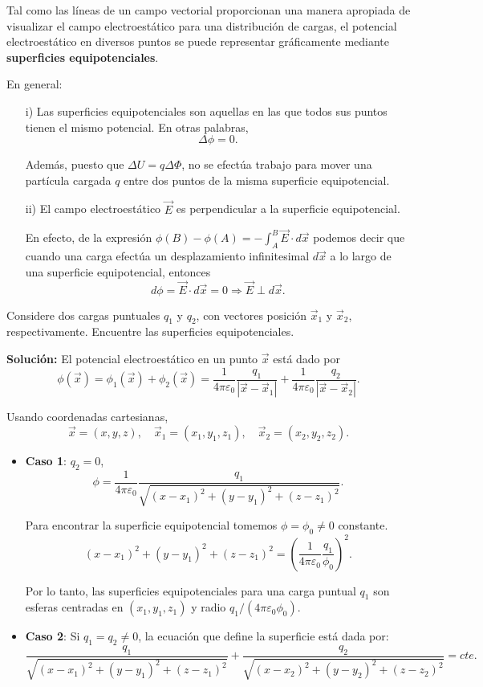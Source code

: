 Tal como las líneas de un campo vectorial proporcionan una manera apropiada de visualizar el campo electroestático para una distribución de cargas, el potencial electroestático en diversos puntos se puede representar gráficamente mediante \textbf{superficies equipotenciales}.

En general:

\begin{itemize}
\item[i)] Las superficies equipotenciales son aquellas en las que todos sus puntos tienen el mismo potencial. En otras palabras,
$$\Delta \phi = 0.$$

Además, puesto que $\Delta U = q \Delta \Phi$, no se efectúa trabajo para mover una partícula cargada $q$ entre dos puntos de la misma superficie equipotencial.

\item[ii)] El campo electroestático $\vec{E}$ es perpendicular a la superficie equipotencial.

En efecto, de la expresión $\phi(B) - \phi(A) = - \int_A^B \vec{E} \cdot d\vec{x}$ podemos decir que cuando una carga efectúa un desplazamiento infinitesimal $d\vec{x}$ a lo largo de una superficie equipotencial, entonces
$$d\phi = \vec{E} \cdot d\vec{x} = 0 \Rightarrow \vec{E} \perp d\vec{x}.$$
\end{itemize} 

\begin{ejemplo}
    Considere dos cargas puntuales $q_1$ y $q_2$, con vectores posición $\Vec{x}_1$ y $\Vec{x}_2$, respectivamente. Encuentre las superficies equipotenciales.

    \textbf{Solución:}  El potencial electroestático en un punto $\Vec{x}$ está dado por
$$\phi(\Vec{x}) = \phi_1(\Vec{x}) + \phi_2(\Vec{x}) = \frac{1}{4\pi\varepsilon_0} \frac{q_1}{|\Vec{x} - \vec{x}_1|} + \frac{1}{4\pi\varepsilon_0} \frac{q_2}{|\Vec{x} - \vec{x}_2|}.$$

Usando coordenadas cartesianas, 
$$\Vec{x} = (x,y,z), \quad \Vec{x}_1 = (x_1,y_1,z_1), \quad \Vec{x}_2 = (x_2,y_2,z_2).$$

\begin{itemize}
\item \textbf{Caso 1}: $q_2 = 0$,
$$\phi = \frac{1}{4\pi\varepsilon_0} \frac{q_1}{\sqrt{(x-x_1)^2 + (y-y_1)^2  + (z-z_1)^2}}.$$

Para encontrar la superficie equipotencial tomemos $\phi = \phi_0 \neq 0$ constante.
$$(x-x_1)^2 + (y-y_1)^2 + (z-z_1)^2 = \left( \frac{1}{4\pi\varepsilon_0} \frac{q_1}{\phi_0} \right)^2.$$

Por lo tanto, las superficies equipotenciales para una carga puntual $q_1$ son esferas centradas en $(x_1,y_1,z_1)$ y radio $q_1/(4\pi\varepsilon_0 \phi_0)$. 

\item \textbf{Caso 2}: Si $q_1 = q_2 \neq 0$, la ecuación que define la superficie está dada por:
\begin{equation*}
 \frac{q_1}{\sqrt{(x-x_1)^2 + (y-y_1)^2  + (z-z_1)^2}} + \frac{q_2}{\sqrt{(x-x_2)^2 + (y-y_2)^2  + (z-z_2)^2}} = cte.
\end{equation*}
\end{itemize}
\end{ejemplo}

